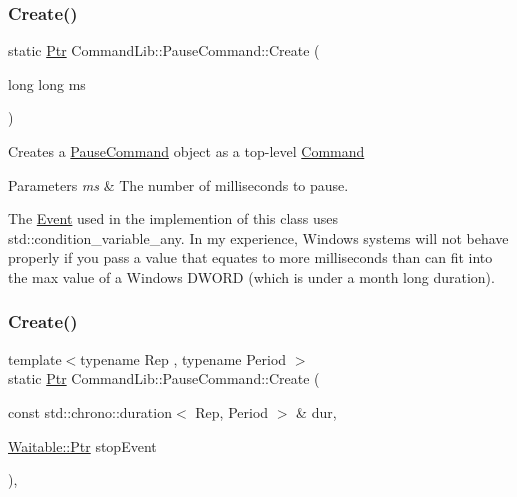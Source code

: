 \subsubsection{\texorpdfstring{Create()}{Create()}\hspace{0.1cm}{\footnotesize\ttfamily [2/4]}}
{\footnotesize\ttfamily static \mbox{\hyperlink{class_command_lib_1_1_command_a3b3e4f00144373299df5c6bb1acc319d}{Ptr}} Command\+Lib\+::\+Pause\+Command\+::\+Create (\begin{DoxyParamCaption}\item[{long long}]{ms }\end{DoxyParamCaption})\hspace{0.3cm}{\ttfamily [static]}}



Creates a \mbox{\hyperlink{class_command_lib_1_1_pause_command}{Pause\+Command}} object as a top-\/level \mbox{\hyperlink{class_command_lib_1_1_command}{Command}}


\begin{DoxyParams}{Parameters}
{\em ms} & The number of milliseconds to pause.\\
\hline
\end{DoxyParams}


The \mbox{\hyperlink{class_command_lib_1_1_event}{Event}} used in the implemention of this class uses std\+::condition\+\_\+variable\+\_\+any. In my experience, Windows systems will not behave properly if you pass a value that equates to more milliseconds than can fit into the max value of a Windows D\+W\+O\+RD (which is under a month long duration). \mbox{\label{class_command_lib_1_1_pause_command_a907d1e6292bfbe4af719515534363c40}} 
\subsubsection{\texorpdfstring{Create()}{Create()}\hspace{0.1cm}{\footnotesize\ttfamily [3/4]}}
{\footnotesize\ttfamily template$<$typename Rep , typename Period $>$ \\
static \mbox{\hyperlink{class_command_lib_1_1_command_a3b3e4f00144373299df5c6bb1acc319d}{Ptr}} Command\+Lib\+::\+Pause\+Command\+::\+Create (\begin{DoxyParamCaption}\item[{const std\+::chrono\+::duration$<$ Rep, Period $>$ \&}]{dur,  }\item[{\mbox{\hyperlink{class_command_lib_1_1_waitable_ac74b6b91e48220146eada76a31cf2d9b}{Waitable\+::\+Ptr}}}]{stop\+Event }\end{DoxyParamCaption})\hspace{0.3cm}{\ttfamily [inline]}, {\ttfamily [static]}}



